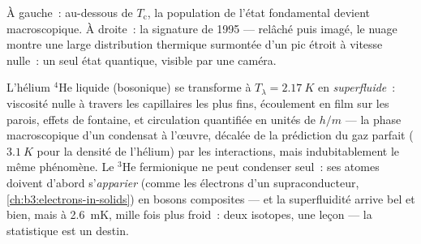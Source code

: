 \begin{omfigure}

{\small À gauche~: au-dessous de $T_{\text{c}}$, la population de
l'état fondamental devient macroscopique. À droite~: la signature de
1995 --- relâché puis imagé, le nuage montre une large distribution
thermique surmontée d'un pic étroit à vitesse nulle~: un seul état
quantique, visible par une caméra.}
\end{omfigure}

\begin{example}\label{ex:b3:quantum-statistics:helium}
L'hélium $^4$He liquide (bosonique) se transforme à
$T_\lambda = \qty{2.17}{K}$ en \emph{superfluide}~: viscosité nulle à
travers les capillaires les plus fins, écoulement en film sur les
parois, effets de fontaine, et circulation quantifiée en unités de
$h/m$ --- la phase macroscopique d'un condensat à l'œuvre, décalée de
la prédiction du gaz parfait ($\qty{3.1}{K}$ pour la densité de
l'hélium) par les interactions, mais indubitablement le même
phénomène. Le $^3$He fermionique ne peut condenser seul~: ses atomes
doivent d'abord s'\emph{apparier} (comme les électrons d'un
supraconducteur, \cref{ch:b3:electrons-in-solids}) en bosons
composites --- et la superfluidité arrive bel et bien, mais à
\qty{2.6}{mK}, mille fois plus froid~: deux isotopes, une leçon ---
la statistique est un destin.
\end{example}

